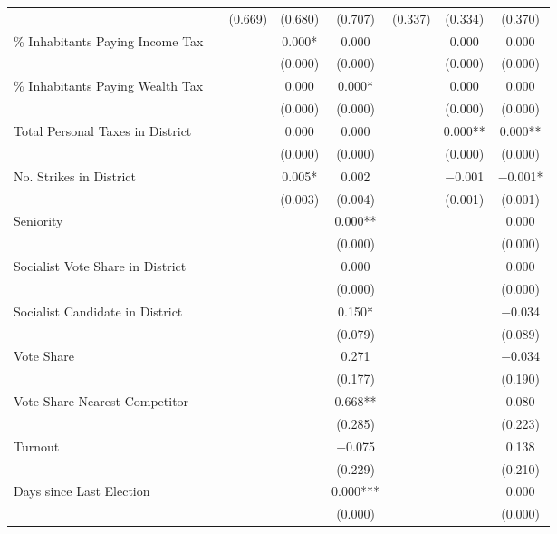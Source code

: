 \begin{table}[!h]
{\begin{threeparttable}
\begin{tabular}[t]{lccccccc}
 &  & (\num{0.669}) & (\num{0.680}) & (\num{0.707}) & (\num{0.337}) & (\num{0.334}) & (\num{0.370})\\
\% Inhabitants Paying Income Tax &  &  & \num{0.000}* & \num{0.000} &  & \num{0.000} & \num{0.000}\\
 &  &  & (\num{0.000}) & (\num{0.000}) &  & (\num{0.000}) & \vphantom{2} (\num{0.000})\\
\% Inhabitants Paying Wealth Tax &  &  & \num{0.000} & \num{0.000}* &  & \num{0.000} & \num{0.000}\\
 &  &  & (\num{0.000}) & (\num{0.000}) &  & (\num{0.000}) & \vphantom{1} (\num{0.000})\\
Total Personal Taxes in District &  &  & \num{0.000} & \num{0.000} &  & \num{0.000}** & \num{0.000}**\\
 &  &  & (\num{0.000}) & (\num{0.000}) &  & (\num{0.000}) & (\num{0.000})\\
No. Strikes in District &  &  & \num{0.005}* & \num{0.002} &  & \num{-0.001} & \num{-0.001}*\\
 &  &  & (\num{0.003}) & (\num{0.004}) &  & (\num{0.001}) & (\num{0.001})\\
Seniority &  &  &  & \num{0.000}** &  &  & \num{0.000}\\
 &  &  &  & (\num{0.000}) &  &  & \vphantom{2} (\num{0.000})\\
Socialist Vote Share in District &  &  &  & \num{0.000} &  &  & \num{0.000}\\
 &  &  &  & (\num{0.000}) &  &  & \vphantom{1} (\num{0.000})\\
Socialist Candidate in District &  &  &  & \num{0.150}* &  &  & \num{-0.034}\\
 &  &  &  & (\num{0.079}) &  &  & (\num{0.089})\\
Vote Share &  &  &  & \num{0.271} &  &  & \num{-0.034}\\
 &  &  &  & (\num{0.177}) &  &  & (\num{0.190})\\
Vote Share Nearest Competitor &  &  &  & \num{0.668}** &  &  & \num{0.080}\\
 &  &  &  & (\num{0.285}) &  &  & (\num{0.223})\\
Turnout &  &  &  & \num{-0.075} &  &  & \num{0.138}\\
 &  &  &  & (\num{0.229}) &  &  & (\num{0.210})\\
Days since Last Election &  &  &  & \num{0.000}*** &  &  & \num{0.000}\\
 &  &  &  & (\num{0.000}) &  &  & (\num{0.000})\\

\end{tabular}
\end{threeparttable}}
\end{table}
